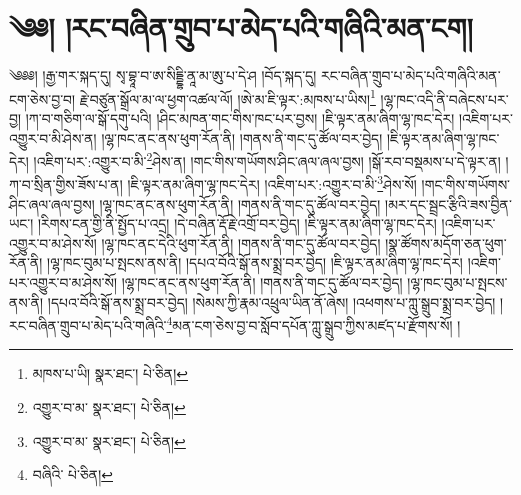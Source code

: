 \setcounter{footnote}{0} 
\chapter{༄༅། །རང་བཞིན་གྲུབ་པ་མེད་པའི་གཞིའི་མན་ངག།}༄༅༅། །རྒྱ་གར་སྐད་དུ། སྭ་བྷཱ་བ་ཨ་སིདྡྷི་ནཱ་མ་ཨུ་པ་དེ་ཤ །བོད་སྐད་དུ། རང་བཞིན་གྲུབ་པ་མེད་པའི་གཞིའི་མན་ངག་ཅེས་བྱ་བ། རྗེ་བཙུན་སྒྲོལ་མ་ལ་ཕྱག་འཚལ་ལོ། །ཨེ་མ་ཇི་ལྟར་:མཁས་པ་ཡིས།\footnote{མཁས་པ་ཡི།  སྣར་ཐང་།  པེ་ཅིན། } །ལྷ་ཁང་འདི་ནི་བཞེངས་པར་བྱ། །ཀ་བ་གཅིག་ལ་སྒོ་དགུ་པའི། །ཤིང་མཁན་གང་གིས་ཁང་པར་བྱས། །ཇི་ལྟར་ནམ་ཞིག་ལྷ་ཁང་དེར། །འཇིག་པར་འགྱུར་བ་མི་ཤེས་ན། །ལྷ་ཁང་ནང་ནས་ཕུག་རོན་ནི། །གནས་ནི་གང་དུ་ཚོལ་བར་བྱེད། །ཇི་ལྟར་ནམ་ཞིག་ལྷ་ཁང་དེར། །འཇིག་པར་:འགྱུར་བ་མི་\footnote{འགྱུར་བ་མ་  སྣར་ཐང་།  པེ་ཅིན། }ཤེས་ན། །གང་གིས་གཡོགས་ཤིང་ཞལ་ཞལ་བྱས། །སྒོ་རབ་བསྡམས་པ་དེ་ལྟར་ན། །ཀ་བ་སྲིན་གྱིས་ཟོས་པ་ན། །ཇི་ལྟར་ནམ་ཞིག་ལྷ་ཁང་དེར། །འཇིག་པར་:འགྱུར་བ་མི་\footnote{འགྱུར་བ་མ་  སྣར་ཐང་།  པེ་ཅིན། }ཤེས་སོ། །གང་གིས་གཡོགས་ཤིང་ཞལ་ཞལ་བྱས། །ལྷ་ཁང་ནང་ནས་ཕུག་རོན་ནི། །གནས་ནི་གང་དུ་ཚོལ་བར་བྱེད། །མར་དང་སྦྲང་རྩིའི་ཟས་བྱིན་ཡང་། །རིགས་ངན་གྱི་ནི་སྤྱོད་པ་འདྲ། །དེ་བཞིན་རྡོ་རྗེ་འགྲོ་བར་བྱེད། །ཇི་ལྟར་ནམ་ཞིག་ལྷ་ཁང་དེར། །འཇིག་པར་འགྱུར་བ་མ་ཤེས་སོ། །ལྷ་ཁང་ནང་དེའི་ཕུག་རོན་ནི། །གནས་ནི་གང་དུ་ཚོལ་བར་བྱེད། །སྣ་ཚོགས་མདོག་ཅན་ཕུག་རོན་ནི། །ལྷ་ཁང་བུམ་པ་སྤངས་ནས་ནི། །དཔའ་བོའི་སྒོ་ནས་སྨྲ་བར་བྱེད། །ཇི་ལྟར་ནམ་ཞིག་ལྷ་ཁང་དེར། །འཇིག་པར་འགྱུར་བ་མ་ཤེས་སོ། །ལྷ་ཁང་ནང་ནས་ཕུག་རོན་ནི། །གནས་ནི་གང་དུ་ཚོལ་བར་བྱེད། །ལྷ་ཁང་བུམ་པ་སྤངས་ནས་ནི། །དཔའ་བོའི་སྒོ་ནས་སྨྲ་བར་བྱེད། །སེམས་ཀྱི་རྣམ་འཕྲུལ་ཡིན་ནོ་ཞེས། །འཕགས་པ་ཀླུ་སྒྲུབ་སྨྲ་བར་བྱེད། །རང་བཞིན་གྲུབ་པ་མེད་པའི་གཞིའི་\footnote{བཞིའི་  པེ་ཅིན། }མན་ངག་ཅེས་བྱ་བ་སློབ་དཔོན་ཀླུ་སྒྲུབ་ཀྱིས་མཛད་པ་རྫོགས་སོ། ། 